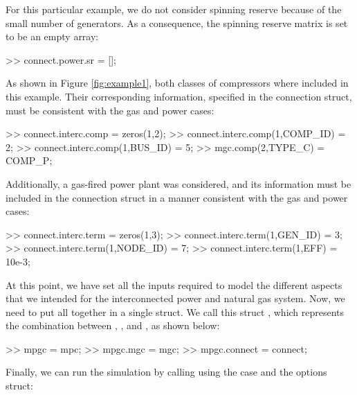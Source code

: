 For this particular example, we do not consider spinning reserve because of the small number of generators. As a consequence, the spinning reserve matrix is set to be an empty array:

\begin{Code}
>> connect.power.sr = [];                      %
\end{Code}

As shown in Figure \ref{fig:example1}, both classes of compressors where included in this example. Their corresponding information, specified in the connection struct, must be consistent with the gas and power cases:

\begin{Code}
>> connect.interc.comp = zeros(1,2); %
>> connect.interc.comp(1,COMP_ID) = 2;       %
>> connect.interc.comp(1,BUS_ID) = 5;        %
>> mgc.comp(2,TYPE_C) = COMP_P;              %
\end{Code}

Additionally, a gas-fired power plant was considered, and its information must be included in the connection struct in a manner consistent with the gas and power cases:

\begin{Code}
>> connect.interc.term = zeros(1,3);       %
>> connect.interc.term(1,GEN_ID)  = 3;     %
>> connect.interc.term(1,NODE_ID) = 7;     %
>> connect.interc.term(1,EFF) = 10e-3;     %
\end{Code}

At this point, we have set all the inputs required to model the different aspects that we intended for the interconnected power and natural gas system. Now, we need to put all together in a single struct. We call this struct , which represents the combination between , , and , as shown below:

\begin{Code}
>> mpgc = mpc;                         %
>> mpgc.mgc = mgc;                     %
>> mpgc.connect = connect;             %
\end{Code}

Finally, we can run the simulation by calling \mpng{} using the  case and the \matpower{} options struct:
 
